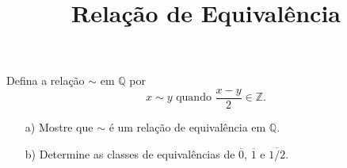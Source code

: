 \documentclass{beamer}
\title{Relação de Equivalência}
\author[\autor]{\autor}
\institute[\instituto]{\instituto}
\date{}
\begin{document}
    \begin{frame}
        \maketitle
    \end{frame}


    \begin{frame}
        \begin{exercicio}
            Defina a relação $\sim$ em $\mathbb{Q}$ por
            \[
                x \sim y \mbox{ quando } \dfrac{x - y}{2} \in \mathbb{Z}.
            \]
            \begin{enumerate}
                \item[a)] Mostre que $\sim$ é um relação de equivalência em $\mathbb{Q}$.
                \item[b)] Determine as classes de equivalências de $\overline{0}$, $\overline{1}$ e $\overline{1/2}$.
            \end{enumerate}
        \end{exercicio}

        \vspace{6cm}
    \end{frame}
\end{document}
